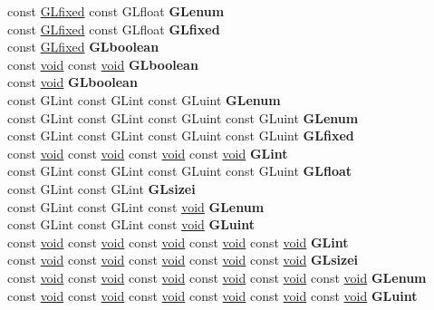 \begin{DoxyCompactItemize}
\begin{tabbing}
\>const \hyperlink{glheader_8h_ad6d3fa892df40dedf48ee6d84529ae5e}{GLfixed} const GLfloat {\bfseries GLenum}\\
\>const \hyperlink{glheader_8h_ad6d3fa892df40dedf48ee6d84529ae5e}{GLfixed} const GLfloat {\bfseries GLfixed}\\
\>const \hyperlink{glheader_8h_ad6d3fa892df40dedf48ee6d84529ae5e}{GLfixed} {\bfseries GLboolean}\\
\>const \hyperlink{interfacevoid}{void} const \hyperlink{interfacevoid}{void} {\bfseries GLboolean}\\
\>const \hyperlink{interfacevoid}{void} {\bfseries GLboolean}\\
\>const GLint const GLint const GLuint {\bfseries GLenum}\\
\>const GLint const GLint const GLuint const GLuint {\bfseries GLenum}\\
\>const GLint const GLint const GLuint const GLuint {\bfseries GLfixed}\\
\>const \hyperlink{interfacevoid}{void} const \hyperlink{interfacevoid}{void} const \hyperlink{interfacevoid}{void} const \hyperlink{interfacevoid}{void} {\bfseries GLint}\\
\>const GLint const GLint const GLuint const GLuint {\bfseries GLfloat}\\
\>const GLint const GLint {\bfseries GLsizei}\\
\>const GLint const GLint const \hyperlink{interfacevoid}{void} {\bfseries GLenum}\\
\>const GLint const GLint const \hyperlink{interfacevoid}{void} {\bfseries GLuint}\\
\>const \hyperlink{interfacevoid}{void} const \hyperlink{interfacevoid}{void} const \hyperlink{interfacevoid}{void} const \hyperlink{interfacevoid}{void} const \hyperlink{interfacevoid}{void} {\bfseries GLint}\\
\>const \hyperlink{interfacevoid}{void} const \hyperlink{interfacevoid}{void} const \hyperlink{interfacevoid}{void} const \hyperlink{interfacevoid}{void} const \hyperlink{interfacevoid}{void} {\bfseries GLsizei}\\
\>const \hyperlink{interfacevoid}{void} const \hyperlink{interfacevoid}{void} const \hyperlink{interfacevoid}{void} const \hyperlink{interfacevoid}{void} const \hyperlink{interfacevoid}{void} const \hyperlink{interfacevoid}{void} {\bfseries GLenum}\\
\>const \hyperlink{interfacevoid}{void} const \hyperlink{interfacevoid}{void} const \hyperlink{interfacevoid}{void} const \hyperlink{interfacevoid}{void} const \hyperlink{interfacevoid}{void} const \hyperlink{interfacevoid}{void} {\bfseries GLuint}\\

\end{tabbing}
\end{DoxyCompactItemize}
